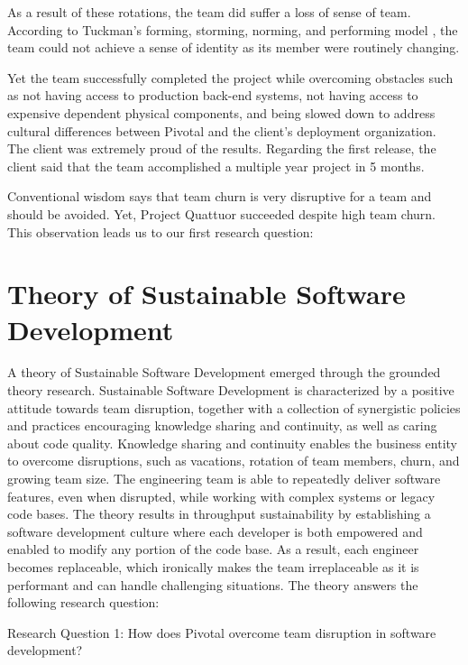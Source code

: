 As a result of these rotations, the team did suffer a loss of sense of team. According to Tuckman's forming, storming, norming, and performing model \cite{TuckmanModel}, the team could not achieve a sense of identity as its member were routinely changing. 

Yet the team successfully completed the project while overcoming obstacles such as not having access to production back-end systems, not having access to expensive dependent physical components, and being slowed down to address cultural differences between Pivotal and the client's deployment organization. The client was extremely proud of the results. Regarding the first release, the client said that the team accomplished a multiple year project in 5 months. 

Conventional wisdom says that team churn is very disruptive for a team and should be avoided. Yet, Project Quattuor succeeded despite high team churn. This observation leads us to our first research question: 

\section{Theory of Sustainable Software Development}
\label{Theory}

A theory of Sustainable Software Development emerged through the grounded theory research. Sustainable Software Development is characterized by a positive attitude towards team disruption, together with a collection of synergistic policies and practices encouraging knowledge sharing and continuity, as well as caring about code quality. Knowledge sharing and continuity enables the business entity to overcome disruptions, such as vacations, rotation of team members, churn, and growing team size. The engineering team is able to repeatedly deliver software features, even when disrupted, while working with complex systems or legacy code bases. The theory results in throughput sustainability by establishing a software development culture where each developer is both empowered and enabled to modify any portion of the code base. As a result, each engineer becomes replaceable, which ironically makes the team irreplaceable as it is performant and can handle challenging situations. The theory answers the following research question:

Research Question 1: How does Pivotal overcome team disruption in software development?

